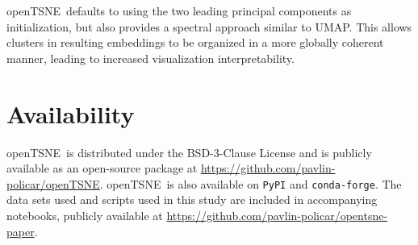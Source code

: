 \documentclass[twocolumn]{bmcart}
\newcommand{\opentsne}{\textsf{openTSNE}}
\begin{document}
\opentsne\ defaults to using the two leading principal components as
initialization, but also provides a spectral approach similar to UMAP.
This allows clusters in resulting embeddings to be organized in a more globally coherent
manner, leading to increased visualization interpretability.

\section*{Availability}

\opentsne\ is distributed under the BSD-3-Clause License and is publicly
available as an open-source package at
\url{https://github.com/pavlin-policar/openTSNE}. \opentsne\ is also available on
\texttt{PyPI} and \texttt{conda-forge}. The data sets used and scripts used in this study are
included in accompanying notebooks, publicly available at
\url{https://github.com/pavlin-policar/opentsne-paper}.

\end{document}
